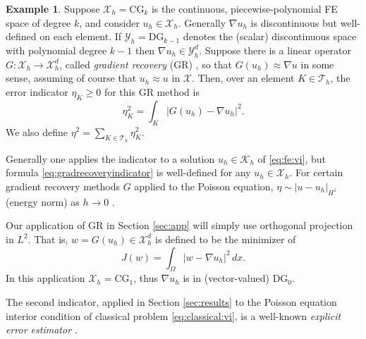 \documentclass[]{interact}
\theoremstyle{plain}%
\theoremstyle{definition}
\newtheorem{example}[theorem]{Example}
\theoremstyle{remark}
\newcommand{\grad}{\nabla}
\newcommand{\cK}{\mathcal{K}}
\newcommand{\cT}{\mathcal{T}}
\newcommand{\cX}{\mathcal{X}}
\newcommand{\cY}{\mathcal{Y}}
\newcommand{\CG}{\text{CG}}
\newcommand{\DG}{\text{DG}}
\begin{document}
\begin{example}  \label{example:gradrecovery}  Suppose $\cX_h=\CG_k$ is the continuous, piecewise-polynomial FE space of degree $k$, and consider $u_h\in\cX_h$.  Generally $\grad u_h$ is discontinuous but well-defined on each element.  If $\cY_h=\DG_{k-1}$ denotes the (scalar) discontinuous space with polynomial degree $k-1$ then $\grad u_h \in \cY_h^d$.  Suppose there is a linear operator $G : \cX_h \to \cX_h^d$, called \emph{gradient recovery} (GR) \citep[Chapter 4]{AinsworthOden2000}, so that $G(u_h)\approx \grad u$ in some sense, assuming of course that $u_h\approx u$ in $\cX$.  Then, over an element $K \in\cT_h$, the error indicator $\eta_K\ge 0$ for this GR method is
\begin{equation} \label{eq:gradrecoveryindicator}
\eta_K^2 = \int_K \left|G(u_h) - \grad u_h\right|^2.
\end{equation}
We also define $\eta^2 = \sum_{K\in\cT_h} \eta_K^2$.
\end{example}

Generally one applies the indicator to a solution $u_h \in \cK_h$ of \eqref{eq:fe:vi}, but formula \eqref{eq:gradrecoveryindicator} is well-defined for any $u_h \in \cX_h$.  For certain gradient recovery methods $G$ applied to the Poisson equation, $\eta \sim |u-u_h|_{H^1}$ (energy norm) as $h\to 0$ \cite[Theorem 4.4]{AinsworthOden2000}.

Our application of GR in Section \ref{sec:app} will simply use orthogonal projection in $L^2$.  That is, $w = G(u_h) \in \cX_h^d$ is defined to be the minimizer of
\begin{equation} \label{eq:gradrecoveryprojection}
J(w) = \int_\Omega |w - \grad u_h|^2\,dx.
\end{equation}
In this application $\cX_h = \CG_1$, thus $\grad u_h$ is in (vector-valued) $\DG_0$.

The second indicator, applied in Section \ref{sec:results} to the Poisson equation interior condition of classical problem \eqref{eq:classical:vi}, is a well-known \emph{explicit error estimator} \cite[Chapter 2]{AinsworthOden2000}.
\end{document}
